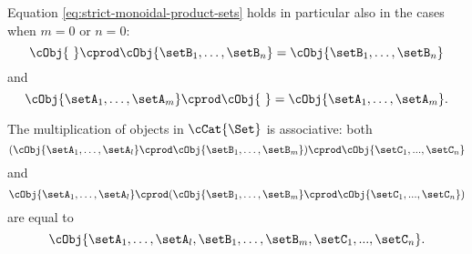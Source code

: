 Equation \cref{eq:strict-monoidal-product-sets} holds in particular also in the cases when $m = 0$ or $n =0$:
\begin{equation}
    \cObj{ \ } \cprod \cObj{\setB_1, \dots, \setB_n} = \cObj{\setB_1,  \dots, \setB_n}
\end{equation}
and
\begin{equation}
    \cObj{\setA_1, \dots, \setA_m} \cprod \cObj{ \ } = \cObj{\setA_1, \dots, \setA_m}.
\end{equation}


\begin{remark}
The multiplication of objects in $\cCat{\Set}$ is associative: both 
\begin{equation}
( \cObj{\setA_1, \dots, \setA_l} \cprod \cObj{\setB_1, \dots, \setB_m}) \cprod \cObj{\setC_1, ..., \setC_n}
\end{equation}
and 
\begin{equation}
\cObj{\setA_1, \dots, \setA_l} \cprod (\cObj{\setB_1, \dots, \setB_m} \cprod \cObj{\setC_1, ..., \setC_n})
\end{equation}
are equal to 
\begin{equation}
\cObj{\setA_1, \dots, \setA_l, \setB_1, \dots, \setB_m, \setC_1, ..., \setC_n}.
\end{equation}
\end{remark}

